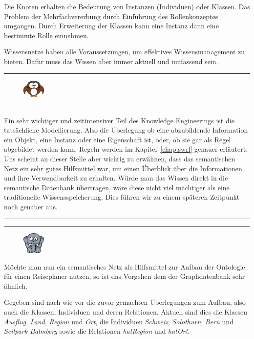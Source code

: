 Die Knoten erhalten die Bedeutung von Instanzen (Individuen) oder Klassen. Das Problem der Mehrfachvererbung durch Einführung des Rollenkonzeptes umgangen. Durch Erweiterung der Klassen kann eine Instanz dann eine bestimmte Rolle einnehmen.

Wissensnetze haben alle Voraussetzungen, um effektives Wissensmanagement zu bieten. Dafür muss das Wissen aber immer aktuell und umfassend sein.

\newpage

\noindent\rule[1ex]{\textwidth}{1pt}
\begin{figure}
    \vspace{-2pt}
    \includegraphics[width=0.1\textwidth]{bilder/owl.png}
\end{figure}\\
Ein sehr wichtiger und zeitintensiver Teil des Knowledge Engineerings ist die tatsächliche Modellierung. Also die Überlegung ob eine abzubildende Information ein Objekt, eine Instanz oder eine Eigenschaft ist, oder, ob sie gar als Regel abgebildet werden kann. Regeln werden im Kapitel~\ref{chap:swrl}  genauer erläutert. Uns scheint an dieser Stelle aber wichtig zu erwähnen, dass das semantischen Netz ein sehr gutes Hilfsmittel war, um einen Überblick über die Informationen und ihre Verwendbarkeit zu erhalten. Würde man das Wissen direkt in die semantische Datenbank übertragen, wäre diese nicht viel mächtiger als eine traditionelle Wissensspeicherung. Dies führen wir zu einem späteren Zeitpunkt noch genauer aus.

\noindent\rule[1ex]{\textwidth}{1pt}


\noindent\rule[1ex]{\textwidth}{1pt}
\begin{figure}
    \vspace{-12pt}
    \includegraphics[width=0.1\textwidth]{bilder/elephant.png}
\end{figure}
Möchte man nun ein semantisches Netz als Hilfsmittel zur Aufbau der Ontologie für einen Reiseplaner nutzen, so ist das Vorgehen dem der Graphdatenbank sehr ähnlich. 

Gegeben sind nach wie vor die zuvor gemachten Überlegungen zum Aufbau, also auch die Klassen, Individuen und deren Relationen. Aktuell sind dies die Klassen \textit{Ausflug}, \textit{Land}, \textit{Region} und \textit{Ort}, die Individuen \textit{Schweiz}, \textit{Solothurn}, \textit{Bern} und \textit{Seilpark Balmberg} sowie die Relationen \textit{hatRegion} und \textit{hatOrt}.

